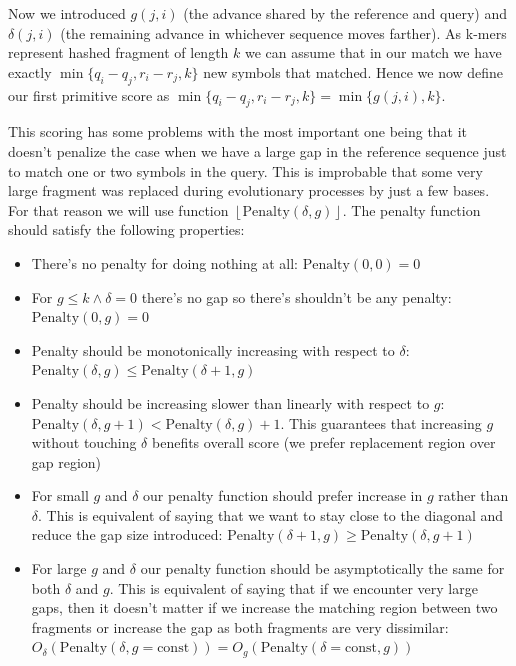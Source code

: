 Now we introduced $g(j,i)$ (the advance shared by the reference and query) and $\delta(j,i)$ (the remaining advance in whichever sequence moves farther).
As k-mers represent hashed fragment of length $k$ we can assume that in our match we have exactly $\min\{q_i-q_j, r_i-r_j, k\}$ new symbols that matched.
Hence we now define our first primitive score as $\min\{q_i-q_j, r_i-r_j, k\} = \min\{g(j,i), k\}$.

This scoring has some problems with the most important one being that it doesn't penalize the case when we have a large gap in the reference sequence just to match one or two symbols in the query. This is improbable that some very large fragment was replaced during evolutionary processes by just a few bases.
For that reason we will use function $\left\lfloor\text{Penalty}(\delta, g)\right\rfloor$. The penalty function should satisfy the following properties:
\begin{itemize}
  \item There's no penalty for doing nothing at all: $\text{Penalty}(0, 0) = 0$
  \item For $g \leq k \land \delta = 0$ there's no gap so there's shouldn't be any penalty: $\text{Penalty}(0, g) = 0$
  \item Penalty should be monotonically increasing with respect to $\delta$: $\text{Penalty}(\delta, g) \leq \text{Penalty}(\delta+1, g)$
  \item Penalty should be increasing slower than linearly with respect to $g$: $\text{Penalty}(\delta, g+1) < \text{Penalty}(\delta, g) + 1$. This guarantees that increasing $g$ without touching $\delta$ benefits overall score (we prefer replacement region over gap region)
  \item For small $g$ and $\delta$ our penalty function should prefer increase in $g$ rather than $\delta$. This is equivalent of saying that we want to stay close to the diagonal and reduce the gap size introduced: $\text{Penalty}(\delta+1, g) \geq \text{Penalty}(\delta, g+1)$
  \item For large $g$ and $\delta$ our penalty function should be asymptotically the same for both $\delta$ and $g$. This is equivalent of saying that if we encounter very large gaps, then it doesn't matter if we increase the matching region between two fragments or increase the gap as both fragments are very dissimilar: $O_{\delta}(\text{Penalty}(\delta, g = \text{const})) = O_{g}(\text{Penalty}(\delta = \text{const}, g))$
\end{itemize}

